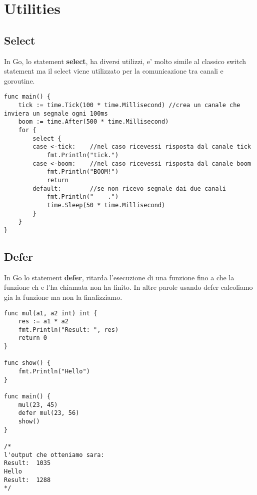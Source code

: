 \newpage
\section{Utilities}
\subsection{Select}
In Go, lo statement \textbf{select}, ha diversi utilizzi, e' molto simile al classico switch statement ma il select viene utilizzato per la comunicazione tra canali e goroutine.

\begin{lstlisting}
func main() {
	tick := time.Tick(100 * time.Millisecond) //crea un canale che inviera un segnale ogni 100ms
	boom := time.After(500 * time.Millisecond)
	for {
		select {
		case <-tick:    //nel caso ricevessi risposta dal canale tick
			fmt.Println("tick.")
		case <-boom:    //nel caso ricevessi risposta dal canale boom
			fmt.Println("BOOM!")
			return
		default:        //se non ricevo segnale dai due canali
			fmt.Println("    .")
			time.Sleep(50 * time.Millisecond)
		}
	}
}
\end{lstlisting}

\subsection{Defer}
In Go lo statement \textbf{defer}, ritarda l'esecuzione di una funzione fino a che la funzione ch e l'ha chiamata non ha finito. In altre parole usando defer calcoliamo gia la funzione ma non la finalizziamo.

\begin{lstlisting}
func mul(a1, a2 int) int {
    res := a1 * a2
    fmt.Println("Result: ", res)
    return 0
}
 
func show() {
    fmt.Println("Hello")
}
 
func main() {
    mul(23, 45)
    defer mul(23, 56)
    show()
}

/*
l'output che otteniamo sara:
Result:  1035
Hello
Result:  1288
*/
\end{lstlisting}



